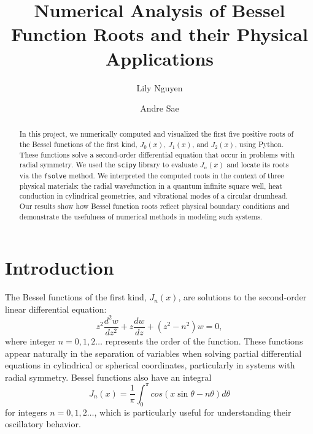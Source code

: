 \documentclass[linenumbers, twocolumn]{aastex631}
\begin{document}
\title{Numerical Analysis of Bessel Function Roots and their Physical Applications}
\author{Lily Nguyen}

\author{Andre Sae}


\begin{abstract}

In this project, we numerically computed and visualized the first five positive
roots of the Bessel functions of the first kind, $J_0(x)$, $J_1(x)$, and $J_2(x)$,
using Python. These functions solve a second-order differential equation that 
occur in problems with radial symmetry. We used the \texttt{scipy} library to
evaluate $J_n(x)$ and locate its roots via the \texttt{fsolve} method. We
interpreted the computed roots in the context of three physical materials: the
radial wavefunction in a quantum infinite square well, heat conduction in
cylindrical geometries, and vibrational modes of a circular drumhead. Our
results show how Bessel function roots reflect physical boundary conditions
and demonstrate the usefulness of numerical methods in modeling such systems.

\end{abstract}



\section{Introduction} \label{sec:intro}

The Bessel functions of the first kind, $J_n(x)$, are solutions to the
second-order linear differential equation:
\begin{equation}
    z^2\frac{d^2 w}{dz^2}+z\frac{dw}{dz}+(z^2-n^2)w=0,
\end{equation}
\noindent where integer $n=0,1,2\dots$ represents the order of the
function. These functions appear naturally in the separation of variables when solving
partial differential equations in cylindrical or spherical coordinates,
particularly in systems with radial symmetry. Bessel functions also have an
integral
\begin{equation}
    J_n(x)=\frac{1}{\pi}\int_0^\pi cos(x\sin\theta-n\theta)d\theta
\end{equation}
\noindent for integers $n=0,1,2\dots$, which is particularly useful for understanding 
their oscillatory behavior.
\end{document}
